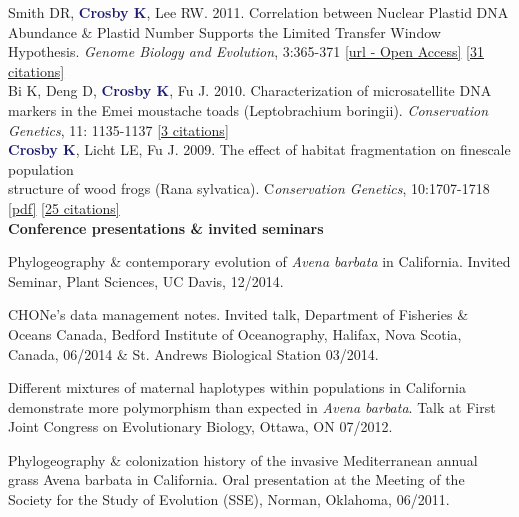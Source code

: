 \documentclass[a4paper,12pt,final]{memoir}
\newcommand{\SmallSep}{\vspace{0.5em}}
\newenvironment{Contact Information}
	{\ignorespaces\textbf{\color{MidnightBlue} Contact Information}}
	{\Sep\ignorespacesafterend}
\newcommand{\CVSection}[1]
	{\Large\textbf{#1}\par
	\SmallSep\normalsize\normalfont}
\begin{document}
Smith DR, \textcolor{MidnightBlue}{\textbf{{Crosby K}}}, Lee RW. 2011. Correlation between Nuclear Plastid DNA Abundance \& Plastid Number Supports the Limited Transfer Window Hypothesis. \textit{Genome Biology and Evolution}, 3:365-371 \href{http://gbe.oxfordjournals.org/content/3/365.long}{[url - Open Access]} \href{http://scholar.google.ca/scholar?oi=bibs&hl=en&cites=9373596750792333707&as_sdt=5}{[31 citations]}\\ 

Bi K, Deng D, \textcolor{MidnightBlue}{\textbf{{Crosby K}}}, Fu J. 2010. Characterization of microsatellite DNA markers in the Emei moustache toads (Leptobrachium boringii). \textit{Conservation Genetics}, 11: 1135-1137 \href{http://scholar.google.ca/scholar?oi=bibs&hl=en&cites=12162043784732384233&as_sdt=5}{[3 citations]}\\

\textcolor{MidnightBlue}{\textbf{{Crosby K}}}, Licht LE, Fu J. 2009. The effect of habitat fragmentation on finescale population \\structure of wood frogs (Rana sylvatica). C\textit{onservation Genetics}, 10:1707-1718 \href{https://www.researchgate.net/profile/Kate_Crosby/publication/226176241_The_effect_of_habitat_fragmentation_on_finescale_population_structure_of_wood_frogs_\%28Rana_sylvatica\%29/links/54988b9f0cf2eeefc30f9a4b.pdf?origin=publication_detail}{[pdf]} \href{http://scholar.google.ca/scholar?oi=bibs&hl=en&cites=3898347670072226343&as_sdt=5}{[25 citations]}\\

\CVSection{Conference presentations \& invited seminars}
Phylogeography \& contemporary evolution of \textit{Avena barbata} in California. Invited Seminar, Plant Sciences, UC Davis, 12/2014.
\SmallSep

CHONe's data management notes. Invited talk, Department of Fisheries \& Oceans Canada, Bedford Institute of Oceanography, Halifax, Nova Scotia, Canada, 06/2014 \& St. Andrews Biological Station 03/2014.
\SmallSep

Different mixtures of maternal haplotypes within populations in California demonstrate more polymorphism than expected in \textit{Avena barbata}. Talk at First Joint Congress on Evolutionary Biology, Ottawa, ON 07/2012.
\SmallSep

Phylogeography \& colonization history of the invasive Mediterranean annual grass Avena barbata in California. Oral presentation at the Meeting of the Society for the Study of Evolution (SSE), Norman, Oklahoma, 06/2011.
\SmallSep
\end{document}
